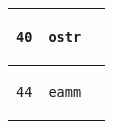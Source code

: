 \documentclass{ti2}
\begin{document}
\begin{tabular}{ | l | l | l|}
\begin{lstlisting}
40
\end{lstlisting} &
\begin{lstlisting}
ostr
\end{lstlisting} &
\begin{lstlisting}
\end{lstlisting} \\ \hline

\begin{lstlisting}
44
\end{lstlisting} &
\begin{lstlisting}
eamm
\end{lstlisting} &
\begin{lstlisting}
\end{lstlisting} \\ \hline

\end{tabular}
\end{document}

